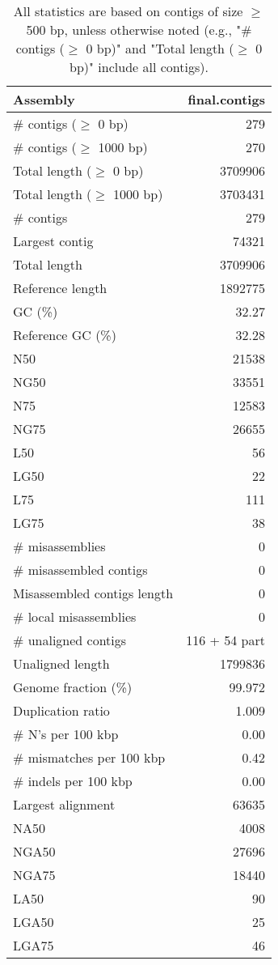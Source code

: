\documentclass[12pt,a4paper]{article}
\begin{document}
\begin{table}[ht]
\begin{center}
\caption{All statistics are based on contigs of size $\geq$ 500 bp, unless otherwise noted (e.g., "\# contigs ($\geq$ 0 bp)" and "Total length ($\geq$ 0 bp)" include all contigs).}
\begin{tabular}{|l*{1}{|r}|}
\hline
Assembly & final.contigs \\ \hline
\# contigs ($\geq$ 0 bp) & 279 \\ \hline
\# contigs ($\geq$ 1000 bp) & 270 \\ \hline
Total length ($\geq$ 0 bp) & 3709906 \\ \hline
Total length ($\geq$ 1000 bp) & 3703431 \\ \hline
\# contigs & 279 \\ \hline
Largest contig & 74321 \\ \hline
Total length & 3709906 \\ \hline
Reference length & 1892775 \\ \hline
GC (\%) & 32.27 \\ \hline
Reference GC (\%) & 32.28 \\ \hline
N50 & 21538 \\ \hline
NG50 & 33551 \\ \hline
N75 & 12583 \\ \hline
NG75 & 26655 \\ \hline
L50 & 56 \\ \hline
LG50 & 22 \\ \hline
L75 & 111 \\ \hline
LG75 & 38 \\ \hline
\# misassemblies & 0 \\ \hline
\# misassembled contigs & 0 \\ \hline
Misassembled contigs length & 0 \\ \hline
\# local misassemblies & 0 \\ \hline
\# unaligned contigs & 116 + 54 part \\ \hline
Unaligned length & 1799836 \\ \hline
Genome fraction (\%) & 99.972 \\ \hline
Duplication ratio & 1.009 \\ \hline
\# N's per 100 kbp & 0.00 \\ \hline
\# mismatches per 100 kbp & 0.42 \\ \hline
\# indels per 100 kbp & 0.00 \\ \hline
Largest alignment & 63635 \\ \hline
NA50 & 4008 \\ \hline
NGA50 & 27696 \\ \hline
NGA75 & 18440 \\ \hline
LA50 & 90 \\ \hline
LGA50 & 25 \\ \hline
LGA75 & 46 \\ \hline
\end{tabular}
\end{center}
\end{table}
\end{document}
